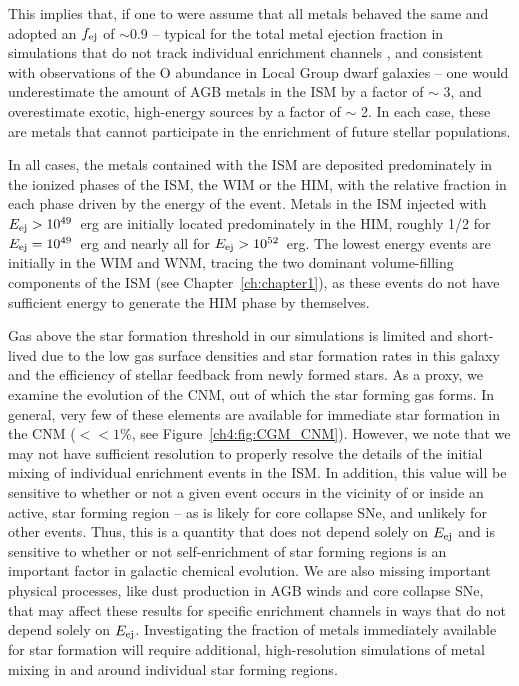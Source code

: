 This implies that, if one to were assume that all metals behaved the same and adopted an $f_{\rm ej}$ of $\sim$0.9 -- typical for the total metal ejection fraction in simulations that do not track individual enrichment channels \citep[e.g.][]{Muratov2017,Christensen2018}, and consistent with observations of the O abundance in Local Group dwarf galaxies \citep[e.g.][]{Kirby2011,McQuinn2015} -- one would underestimate the amount of AGB metals in the ISM by a factor of $\sim$ 3, and overestimate exotic, high-energy sources by a factor of $\sim$ 2. In each case, these are metals that cannot participate in the enrichment of future stellar populations.

In all cases, the metals contained with the ISM are deposited predominately in the ionized phases of the ISM, the WIM or the HIM, with the relative fraction in each phase driven by the energy of the event. Metals in the ISM injected with $E_{\rm ej} > 10^{49}$~erg are initially located predominately in the HIM, roughly 1/2 for $E_{\rm ej} = 10^{49}$~erg and nearly all for $E_{\rm ej} > 10^{52}$~erg. The lowest energy events are initially in the WIM and WNM, tracing the two dominant volume-filling components of the ISM (see Chapter~\ref{ch:chapter1}), as these events do not have sufficient energy to generate the HIM phase by themselves.

Gas above the star formation threshold in our simulations is limited and short-lived due to the low gas surface densities and star formation rates in this galaxy and the efficiency of stellar feedback from newly formed stars. As a proxy, we examine the evolution of the CNM, out of which the star forming gas forms. In general, very few of these elements are available for immediate star formation in the CNM ($<< 1\%$, see Figure~\ref{ch4:fig:CGM_CNM}). However, we note that we may not have sufficient resolution to properly resolve the details of the initial mixing of individual enrichment events in the ISM. In addition, this value will be sensitive to whether or not a given event occurs in the vicinity of or inside an active, star forming region -- as is likely for core collapse SNe, and unlikely for other events. Thus, this is a quantity that does not depend solely on $E_{\rm ej}$ and is sensitive to whether or not self-enrichment of star forming regions is an important factor in galactic chemical evolution. We are also missing important physical processes, like dust production in AGB winds and core collapse SNe, that may affect these results for specific enrichment channels in ways that do not depend solely on $E_{\rm ej}$. Investigating the fraction of metals immediately available for star formation will require additional, high-resolution simulations of metal mixing in and around individual star forming regions.

